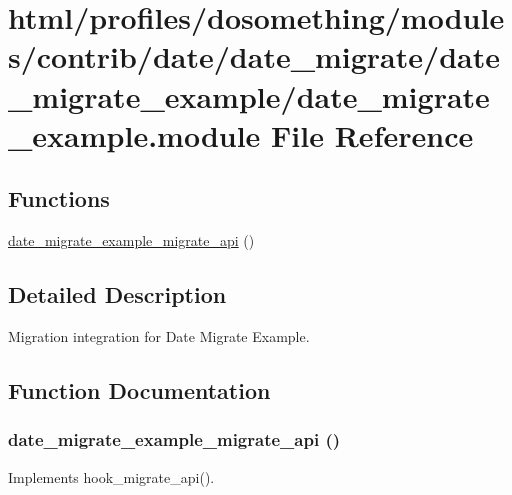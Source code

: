 \hypertarget{date__migrate__example_8module}{
\section{html/profiles/dosomething/modules/contrib/date/date\_\-migrate/date\_\-migrate\_\-example/date\_\-migrate\_\-example.module File Reference}
\label{date__migrate__example_8module}
}
\subsection*{Functions}
\begin{DoxyCompactItemize}
\item 
\hyperlink{date__migrate__example_8module_a85ea7c4c951038e354caf3976a5169df}{date\_\-migrate\_\-example\_\-migrate\_\-api} ()
\end{DoxyCompactItemize}


\subsection{Detailed Description}
Migration integration for Date Migrate Example. 

\subsection{Function Documentation}
\hypertarget{date__migrate__example_8module_a85ea7c4c951038e354caf3976a5169df}{
\subsubsection[{date\_\-migrate\_\-example\_\-migrate\_\-api}]{\setlength{\rightskip}{0pt plus 5cm}date\_\-migrate\_\-example\_\-migrate\_\-api ()}}
\label{date__migrate__example_8module_a85ea7c4c951038e354caf3976a5169df}
Implements hook\_\-migrate\_\-api(). 